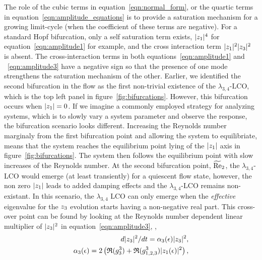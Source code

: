 The role of the cubic terms in equation~\eqref{eqn:normal_form}, or the quartic terms in equation~\eqref{eqn:amplitude_equations} is to provide a saturation mechanism for a growing limit-cycle (when the coefficient of these terms are negative). For a standard Hopf bifurcation, only a self saturation term exists, $|z_{1}|^{4}$ for equation~\eqref{eqn:amplitude1} for example, and the cross interaction term $|z_{1}|^{2}|z_{3}|^{2}$ is absent. The cross-interaction terms in both equations~\eqref{eqn:amplitude1} and ~\eqref{eqn:amplitude3} have a negative sign so that the presence of one mode strengthens the saturation mechanism of the other. Earlier, we identified the second bifurcation in the flow as the first non-trivial existence of the $\lambda_{3,4}$-LCO, which is the top left panel in figure~\ref{fig:bifurcations}. However, this bifurcation occurs when $|z_{1}|=0$. If we imagine a commonly employed strategy for analyzing systems, which is to slowly vary a system parameter and observe the response, the bifurcation scenario looks different. Increasing the Reynolds number marginaly from the first bifurcation point and allowing the system to equilibriate, means that the system reaches the equilibrium point lying of the $|z_{1}|$ axis in figure~\ref{fig:bifurcations}. The system then follows the equilibrium point with slow increases of the Reynolds number. At the second bifurcation point, $\widetilde{\mathrm{Re}}_{2}$, the $\lambda_{3,4}$-LCO would emerge (at least transiently) for a quiescent flow state, however, the non zero $|z_{1}|$ leads to added damping effects and the $\lambda_{3,4}$-LCO remains non-existant. In this scenario, the $\lambda_{3,4}$ LCO can only emerge when the \emph{effective} eigenvalue for the $z_{3}$ evolution starts having a non-negative real part. This cross-over point can be found by looking at the Reynolds number dependent linear multiplier of $|z_{3}|^{2}$ in equation~\eqref{eqn:amplitude3}, \ie, 
\begin{align}
	d|z_{3}|^2/dt = \alpha_{3}(\epsilon)|z_{3}|^{2}, \nonumber \\
	\alpha_{3}(\epsilon) = 2\left(\mathfrak{R}(g^{3}_{3}) +  \mathfrak{R}(g^{3}_{1,2,3})|z_{1}(\epsilon)|^{2}\right), \nonumber
\end{align}
